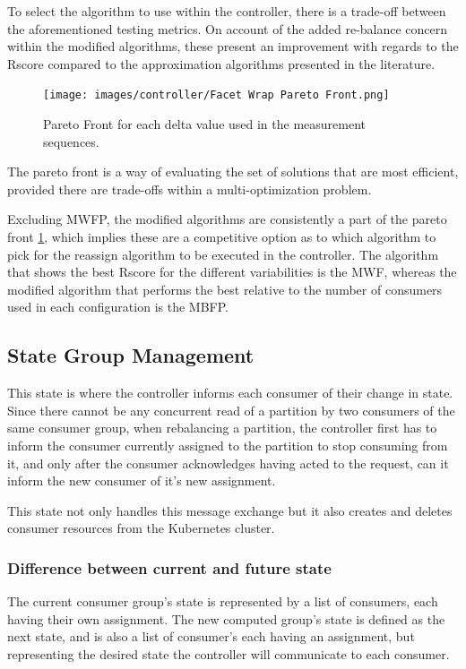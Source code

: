 To select the algorithm to use within the controller, there is a trade-off
between the aforementioned testing metrics. On account of the added re-balance
concern within the modified algorithms, these present an improvement with
regards to the Rscore compared to the approximation algorithms presented in the
literature.

\begin{figure}[H] \centering
\texttt{[image: images/controller/Facet Wrap Pareto
Front.png]} \caption{Pareto Front for each delta value used in the measurement
sequences.} \label{fig:pareto_front} \end{figure}

The pareto front is a way of evaluating the set of solutions that are most
efficient, provided there are trade-offs within a multi-optimization problem.

Excluding MWFP, the modified algorithms are consistently a part of the pareto
front \ref{fig:pareto_front}, which implies these are a competitive option as to
which algorithm to pick for the reassign algorithm to be executed in the
controller. The algorithm that shows the best Rscore for the different
variabilities is the MWF, whereas the modified algorithm that performs the best
relative to the number of consumers used in each configuration is the MBFP.

\subsection{State Group Management}

This state is where the controller informs each consumer of their change in
state. Since there cannot be any concurrent read of a partition by two consumers
of the same consumer group, when rebalancing a partition, the controller first
has to inform the consumer currently assigned to the partition to stop consuming
from it, and only after the consumer acknowledges having acted to the request,
can it inform the new consumer of it's new assignment.

This state not only handles this message exchange but it also creates and
deletes consumer resources from the Kubernetes cluster. 

\subsubsection{Difference between current and future state}

The current consumer group's state is represented by a list of consumers, each
having their own assignment. The new computed group's state is defined as the
next state, and is also a list of consumer's each having an assignment, but
representing the desired state the controller will communicate to each consumer.

